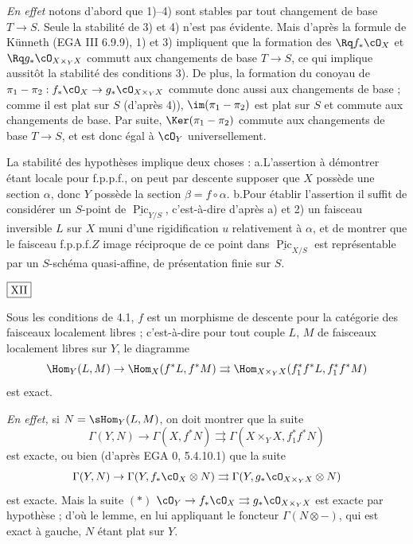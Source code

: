 \noindent\textit{En effet} notons d'abord que 1)--4) sont stables par tout changement de base $T \to S$. Seule la stabilité de 3) et 4) n'est pas évidente. Mais d'après la formule de Künneth (EGA III 6.9.9), 1) et 3) impliquent que la formation des $\Rq f_* \cO_X$ et $\Rq g_* \cO_{X \times_Y X}$ commutt aux changements de base $T \to S$, ce qui implique aussitôt la stabilité des conditions 3). De plus, la formation du conoyau de $\pi_1 - \pi_2 : f_* \cO_X \to g_* \cO_{X \times_Y X}$ commute donc aussi aux changements de base ; comme il est plat sur $S$ (d'après 4)), $\im(\pi_1 - \pi_2)$ est plat sur $S$ et commute aux changements de base. Par suite, $\Ker(\pi_1 - \pi_2)$ commute aux changements de base $T \to S$, et est donc égal à $\cO_Y$ universellement.

La stabilité des hypothèses implique deux choses : a.\@ L'assertion à démontrer étant locale pour f.p.p.f., on peut par descente supposer que $X$ possède une section $\alpha$, donc $Y$ possède la section $\beta = f \circ \alpha$. b.\@ Pour établir l'assertion il suffit de considérer un $S$-point de $\underline{\operatorname{Pic}}_{Y/S}$, c'est-à-dire d'après a) et 2) un faisceau inversible $L$ sur $X$ muni d'une rigidification $u$ relativement à $\alpha$, et de montrer que le faisceau f.p.p.f.\@ $Z$ image réciproque de ce point dans $\underline{\operatorname{Pic}}_{X/S}$ est représentable par un $S$-schéma quasi-affine, de présentation finie sur $S$.

\begin{flushright}
$\fbox{\text{XII}}$
\end{flushright}

\begin{lem}\label{lem:4.2} Sous les conditions de \textup{4.1}, $f$ est un morphisme de descente pour la catégorie des faisceaux localement libres ; c'est-à-dire pour tout couple $L$, $M$ de faisceaux localement libres sur $Y$, le diagramme
\[
\Hom_Y(L,M) \to \Hom_X(f^*L, f^*M) \rightrightarrows \Hom_{X \times_Y X}(f_1^* f^*L, f_1^* f^*M)
\]
est exact.
\end{lem}

\noindent\textit{En effet,} si $N = \sHom_Y(L,M)$, on doit montrer que la suite
\[
\Gamma(Y, N) \to \Gamma(X, f^*N) \rightrightarrows \Gamma(X \times_Y X, f_1^* f^*N)
\]
est exacte, ou bien (d'après EGA 0, 5.4.10.1) que la suite
\[
\Gamma(Y, N) \to \Gamma(Y, f_* \cO_X \otimes N) \rightrightarrows \Gamma(Y, g_* \cO_{X \times_Y X} \otimes N)
\]
est exacte. Mais la suite $(*)$ $\cO_Y \to f_* \cO_X \rightrightarrows g_* \cO_{X \times_Y X}$ est exacte par hypothèse ; d'où le lemme, en lui appliquant le foncteur $\Gamma(N \otimes -)$, qui est exact à gauche, $N$ étant plat sur $Y$.

